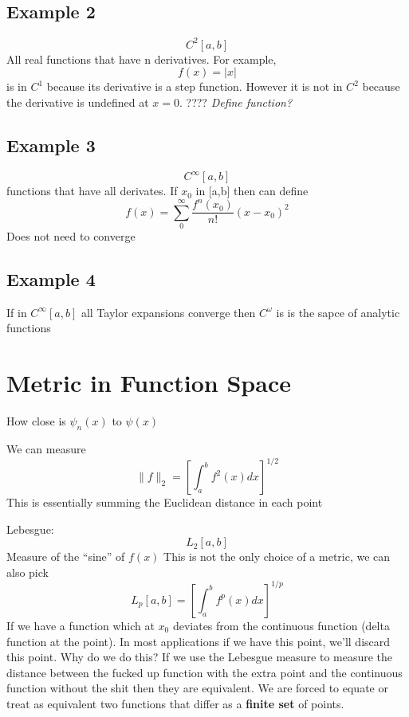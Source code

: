 \documentclass[12pt]{article} %
\begin{document}
\subsection{Example 2}
\begin{equation}
C^2 [a, b]
\end{equation}
All real functions that have n derivatives. For example, 
\begin{equation}
f(x) = |x|
\end{equation}
is in $C^1$ because its derivative is a step function. However it is not
in $C^2$ because the derivative is undefined at $x=0$. ???? \textit{Define
function?}
 
\subsection{Example 3} 
\begin{equation}
C^\infty [a,b]
\end{equation}
functions that have all derivates. If $x_0$ in [a,b] then can define 
\begin{equation} 
f(x) = \sum^\infty_0 \frac{f^n(x_0)}{n!} (x - x_0)^2
\end{equation}
Does not need to converge
\subsection{Example 4}
If in $C^\infty[a,b]$ all Taylor expansions converge then $C^\omega$ is
is the sapce of analytic functions

\section{Metric in Function Space}
How close is $\psi_n(x)$ to $\psi(x)$

We can measure 
\begin{equation}
\| f \|_2 = \left[ \int^b_a f^2(x) dx \right]^{1/2}
\end{equation}
This is essentially summing the Euclidean distance in each point

Lebesgue:
\begin{equation}
L_2[a,b]
\end{equation}
Measure of the ``sine'' of $f(x)$
This is not the only choice of a metric, we can also pick
\begin{equation}
L_p[a,b] = \left[ \int^b_a f^p (x) dx \right]^{1/p}
\end{equation}
If we have a function which at $x_0$ deviates from the continuous function (delta function at the point). In most applications if we have this point, we'll discard this point.  Why do we do this? If we use the Lebesgue measure to measure the distance between the fucked up function with the extra point and the continuous function without the shit then they are equivalent. We are forced to equate or treat as equivalent two functions that differ as a \textbf{finite set} of points. 
\end{document}
